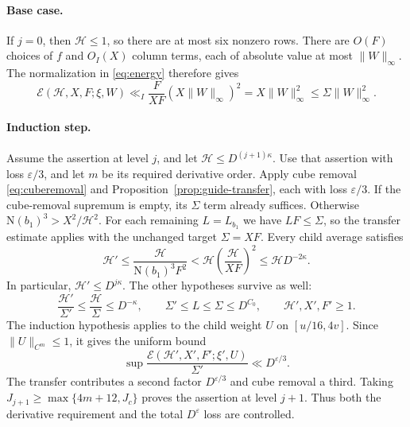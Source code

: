 \documentclass[11pt]{article}
\newcommand{\N}{\mathrm N}
\newcommand{\E}{\mathcal E}
\numberwithin{equation}{section}
\begin{document}
\paragraph{Base case.}
If $j=0$, then $\mathcal H\le1$, so there are at most six nonzero
rows. There are $O(F)$ choices of $f$ and $O_I(X)$ column terms, each
of absolute value at most $\|W\|_\infty$. The normalization in
\eqref{eq:energy} therefore gives
\begin{equation}\label{eq:basecase}
 \E(\mathcal H,X,F;\xi,W)
 \ll_I\frac{F}{XF}(X\|W\|_\infty)^2
 =X\|W\|_\infty^2\le\Sigma\|W\|_\infty^2.
\end{equation}

\paragraph{Induction step.}
Assume the assertion at level $j$, and let
$\mathcal H\le D^{(j+1)\kappa}$. Use that assertion with loss
$\varepsilon/3$, and let $m$ be its required derivative order.
Apply cube removal \eqref{eq:cuberemoval} and
Proposition~\ref{prop:guide-transfer}, each with loss $\varepsilon/3$.
If the cube-removal supremum is empty, its $\Sigma$ term already
suffices. Otherwise $\N(b_1)^3>X^2/\mathcal H^2$.
For each remaining $L=L_{b_1}$ we have $LF\le\Sigma$, so the transfer
estimate applies with the unchanged target $\Sigma=XF$. Every child
average satisfies
\begin{equation}\label{eq:contraction}
 \mathcal H'\le\frac{\mathcal H}{\N(b_1)^3F^2}
 <\mathcal H\left(\frac{\mathcal H}{XF}\right)^2
 \le\mathcal H D^{-2\kappa}.
\end{equation}
In particular, $\mathcal H'\le D^{j\kappa}$. The other hypotheses survive
as well:
\begin{equation}\label{eq:survive}
 \frac{\mathcal H'}{\Sigma'}\le\frac{\mathcal H}{\Sigma}
 \le D^{-\kappa},\qquad
 \Sigma'\le L\le\Sigma\le D^{C_0},\qquad
 \mathcal H',X',F'\ge1.
\end{equation}
The induction hypothesis applies to the child weight $U$ on
$[u/16,4v]$. Since $\|U\|_{C^m}\le1$, it gives the uniform bound
\begin{equation}\label{eq:childbound}
 \sup\frac{\E(\mathcal H',X',F';\xi',U)}{\Sigma'}
 \ll D^{\varepsilon/3}.
\end{equation}
The transfer contributes a second factor $D^{\varepsilon/3}$ and
cube removal a third. Taking $J_{j+1}\ge\max\{4m+12,J_c\}$ proves the
assertion at level $j+1$. Thus both the derivative requirement and
the total $D^\varepsilon$ loss are controlled.
\end{document}
